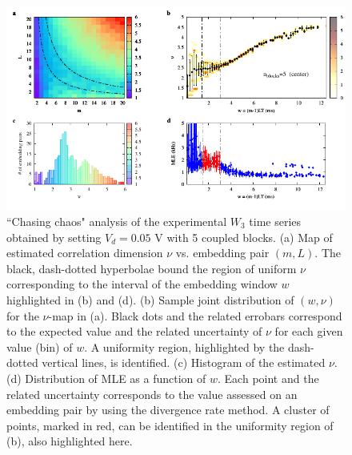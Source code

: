 \begin{figure}[H]
    \centering
    \includegraphics[width=\linewidth]{../blocks/5_blocks/middle/2e5_points/plots/chaos_low.pdf}
    \caption{``Chasing chaos" analysis of the experimental $W_3$ time series obtained by setting $V_d=0.05$ V with 5 coupled blocks.
    (a) Map of estimated correlation dimension $\nu$ vs. embedding pair $(m, L)$.
    The black, dash-dotted hyperbolae bound the region of uniform $\nu$ corresponding to the interval of the
    embedding window $w$ highlighted in (b) and (d).
    (b) Sample joint distribution of $(w,\nu)$ for the $\nu$-map in (a).
    Black dots and the related errobars correspond to the expected value and the related uncertainty of $\nu$
    for each given value (bin) of $w$. A uniformity region, highlighted by the dash-dotted vertical lines,
    is identified. (c) Histogram of the estimated $\nu$. (d) Distribution of MLE as a function of $w$. Each point and the related
    uncertainty corresponds to the value assessed on an embedding pair by using the divergence rate method.
    A cluster of points, marked in red, can be identified in the uniformity region of (b), also highlighted here.}
    \label{fig:5 blocks chaos middle}
\end{figure}


